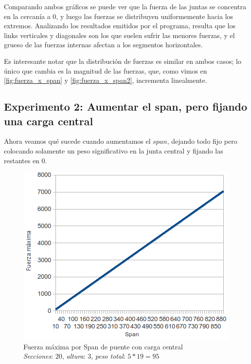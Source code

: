 Comparando ambos gráficos se puede ver que la fuerza de las juntas se concentra
en la cercanía a $0$, y luego las fuerzas se distribuyen uniformemente hacia los extremos. Analizando los resultados emitidos por el programa, resulta que los links verticales y diagonales son los que suelen sufrir las menores fuerzas, y el grueso de las fuerzas internas afectan a los segmentos horizontales.

Es interesante notar que la distribución de fuerzas es similar en ambos casos; lo único que cambia es la magnitud de las fuerzas, que, como vimos en \ref{fig:fuerza_x_span} y \ref{fig:fuerza_x_span2}, incrementa linealmente.

\subsection{Experimento 2: Aumentar el span, pero fijando una carga central}

Ahora veamos qué sucede cuando aumentamos el $span$, dejando todo fijo pero
 colocando solamente un peso significativo en la junta central y fijando las restantes en $0$.\\

\begin{figure}[h!]
\begin{center}
\includegraphics[scale=0.8]{archivos/graficos/Fuerza-x-span-peso-central.png}
\caption{\label{fig:fuerza_x_span_peso_central}Fuerza máxima por Span de puente con carga central\\
\textit{Secciones}: $20$, \textit{altura}: $3$, \textit{peso total}: $5 * 19 = 95$}
\end{center}
\end{figure}

